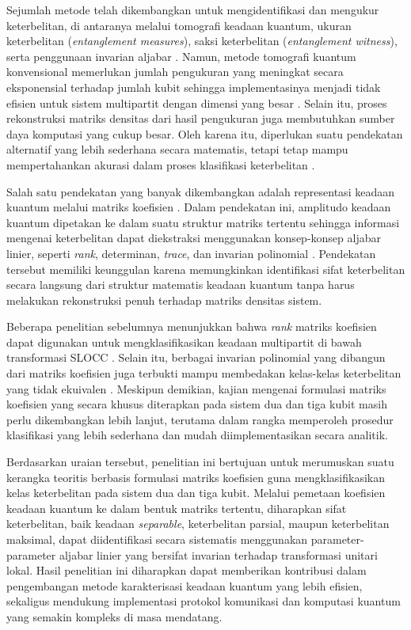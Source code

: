 \par
Sejumlah metode telah dikembangkan untuk mengidentifikasi dan mengukur keterbelitan, di antaranya melalui tomografi keadaan kuantum, ukuran keterbelitan (\textit{entanglement measures}), saksi keterbelitan (\textit{entanglement witness}), serta penggunaan invarian aljabar \cite{Guhne2009}. Namun, metode tomografi kuantum konvensional memerlukan jumlah pengukuran yang meningkat secara eksponensial terhadap jumlah kubit sehingga implementasinya menjadi tidak efisien untuk sistem multipartit dengan dimensi yang besar \cite{Paris2004}. Selain itu, proses rekonstruksi matriks densitas dari hasil pengukuran juga membutuhkan sumber daya komputasi yang cukup besar. Oleh karena itu, diperlukan suatu pendekatan alternatif yang lebih sederhana secara matematis, tetapi tetap mampu mempertahankan akurasi dalam proses klasifikasi keterbelitan \cite{Quek2021,Howland2014}.
\par
Salah satu pendekatan yang banyak dikembangkan adalah representasi keadaan kuantum melalui matriks koefisien \cite{Chen2013,nielsen2010quantum}. Dalam pendekatan ini, amplitudo keadaan kuantum dipetakan ke dalam suatu struktur matriks tertentu sehingga informasi mengenai keterbelitan dapat diekstraksi menggunakan konsep-konsep aljabar linier, seperti \textit{rank}, determinan, \textit{trace}, dan invarian polinomial \cite{Li2012,Luque2003}. Pendekatan tersebut memiliki keunggulan karena memungkinkan identifikasi sifat keterbelitan secara langsung dari struktur matematis keadaan kuantum tanpa harus melakukan rekonstruksi penuh terhadap matriks densitas sistem.
\par
Beberapa penelitian sebelumnya menunjukkan bahwa \textit{rank} matriks koefisien dapat digunakan untuk mengklasifikasikan keadaan multipartit di bawah transformasi SLOCC \cite{Li2012}. Selain itu, berbagai invarian polinomial yang dibangun dari matriks koefisien juga terbukti mampu membedakan kelas-kelas keterbelitan yang tidak ekuivalen \cite{Luque2003}. Meskipun demikian, kajian mengenai formulasi matriks koefisien yang secara khusus diterapkan pada sistem dua dan tiga kubit masih perlu dikembangkan lebih lanjut, terutama dalam rangka memperoleh prosedur klasifikasi yang lebih sederhana dan mudah diimplementasikan secara analitik.
\par
Berdasarkan uraian tersebut, penelitian ini bertujuan untuk merumuskan suatu kerangka teoritis berbasis formulasi matriks koefisien guna mengklasifikasikan kelas keterbelitan pada sistem dua dan tiga kubit. Melalui pemetaan koefisien keadaan kuantum ke dalam bentuk matriks tertentu, diharapkan sifat keterbelitan, baik keadaan \textit{separable}, keterbelitan parsial, maupun keterbelitan maksimal, dapat diidentifikasi secara sistematis menggunakan parameter-parameter aljabar linier yang bersifat invarian terhadap transformasi unitari lokal. Hasil penelitian ini diharapkan dapat memberikan kontribusi dalam pengembangan metode karakterisasi keadaan kuantum yang lebih efisien, sekaligus mendukung implementasi protokol komunikasi dan komputasi kuantum yang semakin kompleks di masa mendatang.

